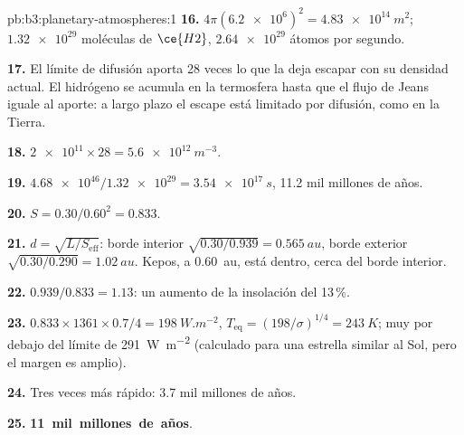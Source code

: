 \begin{solution}{pb:b3:planetary-atmospheres:1}
\textbf{16.} $4\pi(\num{6.2e6})^2 = \qty{4.83e14}{m^2}$; $\num{1.32e29}$ moléculas
de $\ce{H2}$, $\num{2.64e29}$ átomos por segundo.

\textbf{17.} El límite de difusión aporta 28 veces lo que la  deja escapar con
su densidad actual. El hidrógeno se acumula en la termosfera hasta que el
flujo de Jeans iguale al aporte: a largo plazo el escape está
limitado por difusión, como en la Tierra.

\textbf{18.} $\num{2e11}\times28 = \qty{5.6e12}{m^{-3}}$.

\textbf{19.} $\num{4.68e46}/\num{1.32e29} = \qty{3.54e17}{s}$, 11.2 mil millones de años.

\textbf{20.} $S = 0.30/0.60^2 = 0.833$.

\textbf{21.} $d = \sqrt{L/S_\mathrm{eff}}$: borde interior $\sqrt{0.30/0.939} =
\qty{0.565}{au}$, borde exterior $\sqrt{0.30/0.290} = \qty{1.02}{au}$. Kepos,
a \qty{0.60}{au}, está dentro, cerca del borde interior.

\textbf{22.} $0.939/0.833 = 1.13$: un aumento de la insolación del 13\,\%.

\textbf{23.} $0.833\times1361\times0.7/4 = \qty{198}{W.m^{-2}}$, $T_\mathrm{eq} =
(198/\sigma)^{1/4} = \qty{243}{K}$; muy por debajo del
límite de \qty{291}{W.m^{-2}} (calculado para una estrella similar al Sol, pero el margen
es amplio).

\textbf{24.} Tres veces más rápido: 3.7 mil millones de años.

\textbf{25.} \textbf{11~mil~millones~de~años}.
\end{solution}
